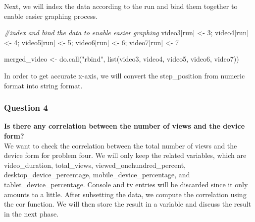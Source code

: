 \documentclass[12pt,]{article}
\newenvironment{Shaded}{\begin{snugshade}}{\end{snugshade}}
\newcommand{\CommentTok}[1]{\textcolor[rgb]{0.56,0.35,0.01}{\textit{#1}}}
\newcommand{\DecValTok}[1]{\textcolor[rgb]{0.00,0.00,0.81}{#1}}
\newcommand{\FunctionTok}[1]{\textcolor[rgb]{0.00,0.00,0.00}{#1}}
\newcommand{\NormalTok}[1]{#1}
\newcommand{\OtherTok}[1]{\textcolor[rgb]{0.56,0.35,0.01}{#1}}
\newcommand{\SpecialCharTok}[1]{\textcolor[rgb]{0.00,0.00,0.00}{#1}}
\newcommand{\StringTok}[1]{\textcolor[rgb]{0.31,0.60,0.02}{#1}}
\begin{document}
Next, we will index the data according to the run and bind them together
to enable easier graphing process.

\begin{Shaded}
\begin{Highlighting}[]
\CommentTok{\#index and bind the data to enable easier graphing }
\NormalTok{video3[}\StringTok{\textquotesingle{}run\textquotesingle{}}\NormalTok{] }\OtherTok{\textless{}{-}} \DecValTok{3}\NormalTok{; video4[}\StringTok{\textquotesingle{}run\textquotesingle{}}\NormalTok{] }\OtherTok{\textless{}{-}} \DecValTok{4}\NormalTok{; }
\NormalTok{video5[}\StringTok{\textquotesingle{}run\textquotesingle{}}\NormalTok{] }\OtherTok{\textless{}{-}} \DecValTok{5}\NormalTok{; video6[}\StringTok{\textquotesingle{}run\textquotesingle{}}\NormalTok{] }\OtherTok{\textless{}{-}} \DecValTok{6}\NormalTok{;}
\NormalTok{video7[}\StringTok{\textquotesingle{}run\textquotesingle{}}\NormalTok{] }\OtherTok{\textless{}{-}} \DecValTok{7}

\NormalTok{merged\_video }\OtherTok{\textless{}{-}} \FunctionTok{do.call}\NormalTok{(}\StringTok{"rbind"}\NormalTok{, }\FunctionTok{list}\NormalTok{(video3, video4, video5, }
\NormalTok{                                        video6, video7))}
\end{Highlighting}
\end{Shaded}

In order to get accurate x-axis, we will convert the step\_position from
numeric format into string format.

\begin{Shaded}
\end{Shaded}

\hypertarget{question-4}{%
\subsubsection{Question 4}\label{question-4}}

\textbf{Is there any correlation between the number of views and the
device form?}\\
\hfill\break We want to check the correlation between the total number
of views and the device form for problem four. We will only keep the
related variables, which are video\_duration, total\_views,
viewed\_onehundred\_percent, desktop\_device\_percentage,
mobile\_device\_percentage, and tablet\_device\_percentage. Console and
tv entries will be discarded since it only amounts to a little. After
subsetting the data, we compute the correlation using the cor function.
We will then store the result in a variable and discuss the result in
the next phase.
\end{document}
